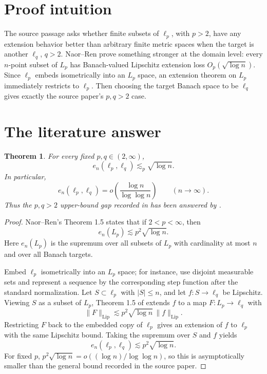 \documentclass[11pt]{article}
\newtheorem{theorem}{Theorem}
\newcommand{\en}{e_n}
\begin{document}
\section*{Proof intuition}

The source passage asks whether finite subsets of \(\ell_p\), with
\(p>2\), have any extension behavior better than arbitrary finite metric
spaces when the target is another \(\ell_q\), \(q>2\).  Naor--Ren prove
something stronger at the domain level: every \(n\)-point subset of \(L_p\)
has Banach-valued Lipschitz extension loss \(O_p(\sqrt{\log n})\).  Since
\(\ell_p\) embeds isometrically into an \(L_p\) space, an extension theorem
on \(L_p\) immediately restricts to \(\ell_p\).  Then choosing the target
Banach space to be \(\ell_q\) gives exactly the source paper's
\(p,q>2\) case.

\section*{The literature answer}

\begin{theorem}
For every fixed \(p,q\in(2,\infty)\),
\[
  \en(\ell_p,\ell_q)\lesssim_p \sqrt{\log n}.
\]
In particular,
\[
  \en(\ell_p,\ell_q)
  = o\!\left(\frac{\log n}{\log\log n}\right)
  \qquad (n\to\infty).
\]
Thus the \(p,q>2\) upper-bound gap recorded in \cite{NR17} has been answered
by \cite{NRen}.
\end{theorem}

\begin{proof}
Naor--Ren's Theorem 1.5 \cite{NRen} states that if \(2<p<\infty\), then
\[
  \en(L_p)\lesssim p^2\sqrt{\log n}.
\]
Here \(\en(L_p)\) is the supremum over all subsets of \(L_p\) with
cardinality at most \(n\) and over all Banach targets.

Embed \(\ell_p\) isometrically into an \(L_p\) space; for instance, use
disjoint measurable sets and represent a sequence by the corresponding
step function after the standard normalization.  Let
\(S\subset \ell_p\) with \(|S|\le n\), and let
\(f:S\to \ell_q\) be Lipschitz.  Viewing \(S\) as a subset of \(L_p\),
Theorem 1.5 of \cite{NRen} extends \(f\) to a map
\(F:L_p\to\ell_q\) with
\[
  \|F\|_{\operatorname{Lip}}\lesssim p^2\sqrt{\log n}\,
  \|f\|_{\operatorname{Lip}}.
\]
Restricting \(F\) back to the embedded copy of \(\ell_p\) gives an extension
of \(f\) to \(\ell_p\) with the same Lipschitz bound.  Taking the supremum
over \(S\) and \(f\) yields
\[
  \en(\ell_p,\ell_q)\lesssim p^2\sqrt{\log n}.
\]
For fixed \(p\), \(p^2\sqrt{\log n}=o((\log n)/\log\log n)\), so this is
asymptotically smaller than the general \cite{LN05} bound recorded in the
source paper.
\end{proof}
\end{document}
